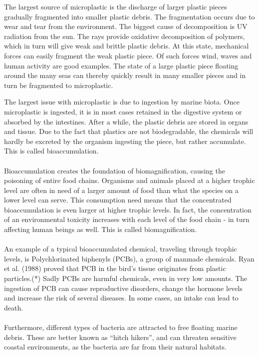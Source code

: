 The largest source of microplastic is the discharge of larger plastic pieces gradually fragmented into smaller plastic debris. The fragmentation occurs due to wear and tear from the environment. The biggest cause of decomposition is UV radiation from the sun. The rays provide oxidative decomposition of polymers, which in turn will give weak and brittle plastic debris. At this state, mechanical forces can easily fragment the weak plastic piece. Of such forces wind, waves and human activity are good examples. The state of a large plastic piece floating around the many seas can thereby quickly result in many smaller pieces and in turn be fragmented to microplastic.

The largest issue with microplastic is due to ingestion by marine biota. Once microplastic is ingested, it is in most cases retained in the digestive system or absorbed by the intestines. After a while, the plastic debris are stored in organs and tissue. Due to the fact that plastics are not biodegradable, the chemicals will hardly be excreted by the organism ingesting the piece, but rather accumulate. This is called bioaccumulation. 
\\\\
Bioaccumulation creates the foundation of biomagnification, causing the poisoning of entire food chains. Organisms and animals placed at a higher trophic level are often in need of a larger amount of food than what the species on a lower level can serve. This consumption need means that the concentrated bioaccumulation is even larger at higher trophic levels. In fact, the concentration of an environmental toxicity increases with each level of the food chain - in turn affecting human beings as well. This is called biomagnification. 
\\\\
An example of a typical bioaccumulated chemical, traveling through trophic levels, is Polychlorinated biphenyls (PCBs), a group of manmade chemicals. Ryan et al. (1988) proved that PCB in the bird's tissue originates from plastic particles.(*) Sadly PCBs are harmful chemicals, even in very low amounts. The ingestion of PCB can cause reproductive disorders, change the hormone levels and increase the risk of several diseases. In some cases, an intake can lead to death. %
\\\\
Furthermore, different types of bacteria are attracted to free floating marine debris. These are better known as “hitch hikers”, and can threaten sensitive coastal environments, as the bacteria are far from their natural habitats. 

